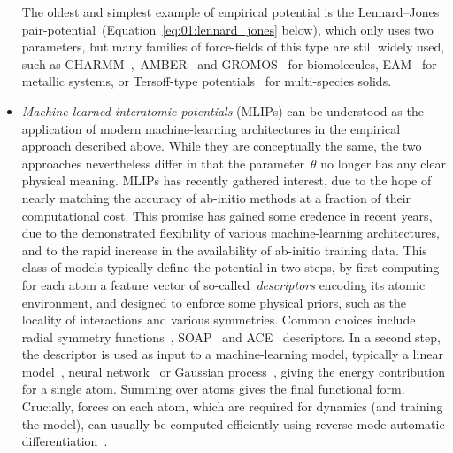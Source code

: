 \begin{itemize}
{    The oldest and simplest example of empirical potential is the Lennard--Jones pair-potential~(Equation~\eqref{eq:01:lennard_jones} below), which only uses two parameters, but many families of force-fields of this type are still widely used, such as CHARMM~\cite{BBOSSK83},~AMBER~\cite{PCCRCDFSK95} and GROMOS~\cite{SHTMBFTHKVG99} for biomolecules, EAM~\cite{DB84} for metallic systems, or Tersoff-type potentials~\cite{T89} for multi-species solids.}
    \item{\textit{Machine-learned interatomic potentials} (MLIPs) can be understood as the application of modern machine-learning architectures in the empirical approach described above. While they are conceptually the same, the two approaches nevertheless differ in that the parameter~$\theta$ no longer has any clear physical meaning. MLIPs has recently gathered interest, due to the hope of nearly matching the accuracy of ab-initio methods at a fraction of their computational cost. This promise has gained some credence in recent years, due to the demonstrated flexibility of various machine-learning architectures, and to the rapid increase in the availability of ab-initio training data. This class of models typically define the potential in two steps, by first computing for each atom a feature vector of so-called~\textit{descriptors} encoding its atomic environment, and designed to enforce some physical priors, such as the locality of interactions and various symmetries. Common choices include radial symmetry functions~\cite{BP07}, SOAP~\cite{BKC13} and ACE~\cite{D19} descriptors.
    In a second step, the descriptor is used as input to a machine-learning model, typically a linear model~\cite{TSTFT15}, neural network~\cite{BP07} or Gaussian process~\cite{BPKC10}, giving the energy contribution for a single atom. Summing over atoms gives the final functional form. Crucially, forces on each atom, which are required for dynamics (and training the model), can usually be computed efficiently using reverse-mode automatic differentiation~\cite{BPRS18}.
    }
\end{itemize}

